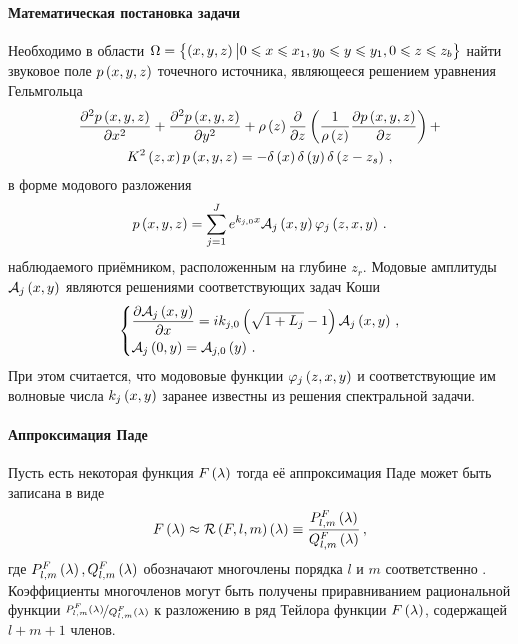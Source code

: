\documentclass[../document.tex]{subfiles}
\begin{document}
            \paragraph{Математическая постановка задачи}
                \par Необходимо в области $\Omega=\left\{\left(x,y,z\right)\big|0\leqslant x\leqslant x_1,y_0\leqslant y\leqslant y_1,0\leqslant z\leqslant z_b\right\}$ найти звуковое поле $p\left(x,y,z\right)$ точечного источника, являющееся решением уравнения Гельмгольца
                \begin{multline}
                    \frac{\partial^2p\left(x,y,z\right)}{\partial x^2}+\frac{\partial^2p\left(x,y,z\right)}{\partial y^2}+\rho\left(z\right)\frac{\partial}{\partial z}\left(\frac{1}{\rho\left(z\right)}\frac{\partial p\left(x,y,z\right)}{\partial z}\right)+\\
                    K^2\left(z,x\right)p\left(x,y,z\right)=-\delta\left(x\right)\delta\left(y\right)\delta\left(z-z_s\right)\,,
                \end{multline}
                в форме модового разложения
                \begin{equation}
                    p\left(x,y,z\right)=\sum\limits_{j=1}^Je^{k_{j,0}x}\mathcal{A}_j\left(x,y\right)\varphi_j\left(z,x,y\right)\,.
                \end{equation}
                наблюдаемого приёмником, расположенным на глубине $z_r$. Модовые амплитуды $\mathcal{A}_j\left(x,y\right)$ являются решениями соответствующих задач Коши
                \begin{equation}\label{eq::WAMPE_problem}
                    \begin{dcases}
                        \frac{\partial\mathcal{A}_j\left(x,y\right)}{\partial x}=ik_{j,0}\left(\sqrt{1+L_j}-1\right)\mathcal{A}_j\left(x,y\right)\,,\\
                        \mathcal{A}_j\left(0,y\right)=\mathcal{A}_{j,0}\left(y\right)\,.
                    \end{dcases}
                \end{equation}
                При этом считается, что модововые функции $\varphi_j\left(z,x,y\right)$ и соответствующие им волновые числа $k_j\left(x,y\right)$ заранее известны из решения спектральной задачи.
            \paragraph{Аппроксимация Паде}
                \par Пусть есть некоторая функция $F\left(\lambda\right)$ тогда её аппроксимация Паде может быть записана в виде
                \begin{equation}
                    F\left(\lambda\right)\approx\mathcal{R}\left(F,l,m\right)\left(\lambda\right)\equiv\frac{P_{l,m}^F\left(\lambda\right)}{Q_{l,m}^F\left(\lambda\right)}\,,
                \end{equation}
                где $P_{l,m}^F\left(\lambda\right),Q_{l,m}^F\left(\lambda\right)$ обозначают многочлены порядка $l$ и $m$ соответственно \cite{jensen}. Коэффициенты многочленов могут быть получены приравниванием рациональной функции $\nicefrac{P_{l,m}^F\left(\lambda\right)}{Q_{l,m}^F\left(\lambda\right)}$ к разложению в ряд Тейлора функции $F\left(\lambda\right)$, содержащей $l+m+1$ членов.
\end{document}
